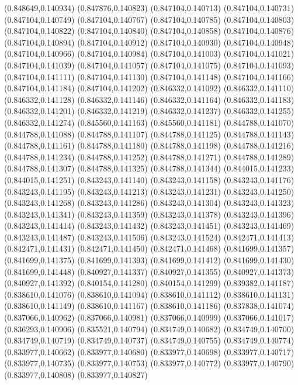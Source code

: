 (0.848649,0.140934)
(0.847876,0.140823)
(0.847104,0.140713)
(0.847104,0.140731)
(0.847104,0.140749)
(0.847104,0.140767)
(0.847104,0.140785)
(0.847104,0.140803)
(0.847104,0.140822)
(0.847104,0.140840)
(0.847104,0.140858)
(0.847104,0.140876)
(0.847104,0.140894)
(0.847104,0.140912)
(0.847104,0.140930)
(0.847104,0.140948)
(0.847104,0.140966)
(0.847104,0.140984)
(0.847104,0.141003)
(0.847104,0.141021)
(0.847104,0.141039)
(0.847104,0.141057)
(0.847104,0.141075)
(0.847104,0.141093)
(0.847104,0.141111)
(0.847104,0.141130)
(0.847104,0.141148)
(0.847104,0.141166)
(0.847104,0.141184)
(0.847104,0.141202)
(0.846332,0.141092)
(0.846332,0.141110)
(0.846332,0.141128)
(0.846332,0.141146)
(0.846332,0.141164)
(0.846332,0.141183)
(0.846332,0.141201)
(0.846332,0.141219)
(0.846332,0.141237)
(0.846332,0.141255)
(0.846332,0.141274)
(0.845560,0.141163)
(0.845560,0.141181)
(0.844788,0.141070)
(0.844788,0.141088)
(0.844788,0.141107)
(0.844788,0.141125)
(0.844788,0.141143)
(0.844788,0.141161)
(0.844788,0.141180)
(0.844788,0.141198)
(0.844788,0.141216)
(0.844788,0.141234)
(0.844788,0.141252)
(0.844788,0.141271)
(0.844788,0.141289)
(0.844788,0.141307)
(0.844788,0.141325)
(0.844788,0.141344)
(0.844015,0.141233)
(0.844015,0.141251)
(0.843243,0.141140)
(0.843243,0.141158)
(0.843243,0.141176)
(0.843243,0.141195)
(0.843243,0.141213)
(0.843243,0.141231)
(0.843243,0.141250)
(0.843243,0.141268)
(0.843243,0.141286)
(0.843243,0.141304)
(0.843243,0.141323)
(0.843243,0.141341)
(0.843243,0.141359)
(0.843243,0.141378)
(0.843243,0.141396)
(0.843243,0.141414)
(0.843243,0.141432)
(0.843243,0.141451)
(0.843243,0.141469)
(0.843243,0.141487)
(0.843243,0.141506)
(0.843243,0.141524)
(0.842471,0.141413)
(0.842471,0.141431)
(0.842471,0.141450)
(0.842471,0.141468)
(0.841699,0.141357)
(0.841699,0.141375)
(0.841699,0.141393)
(0.841699,0.141412)
(0.841699,0.141430)
(0.841699,0.141448)
(0.840927,0.141337)
(0.840927,0.141355)
(0.840927,0.141373)
(0.840927,0.141392)
(0.840154,0.141280)
(0.840154,0.141299)
(0.839382,0.141187)
(0.838610,0.141076)
(0.838610,0.141094)
(0.838610,0.141112)
(0.838610,0.141131)
(0.838610,0.141149)
(0.838610,0.141167)
(0.838610,0.141186)
(0.837838,0.141074)
(0.837066,0.140962)
(0.837066,0.140981)
(0.837066,0.140999)
(0.837066,0.141017)
(0.836293,0.140906)
(0.835521,0.140794)
(0.834749,0.140682)
(0.834749,0.140700)
(0.834749,0.140719)
(0.834749,0.140737)
(0.834749,0.140755)
(0.834749,0.140774)
(0.833977,0.140662)
(0.833977,0.140680)
(0.833977,0.140698)
(0.833977,0.140717)
(0.833977,0.140735)
(0.833977,0.140753)
(0.833977,0.140772)
(0.833977,0.140790)
(0.833977,0.140808)
(0.833977,0.140827)

